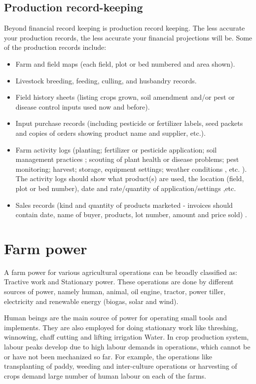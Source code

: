 \documentclass[11pt,]{book}
\providecommand{\tightlist}{%
  \setlength{\itemsep}{0pt}\setlength{\parskip}{0pt}}
\theoremstyle{definition}
\theoremstyle{definition}
\theoremstyle{definition}
\theoremstyle{remark}
\begin{document}

\subsection{Production record-keeping}\label{production-record-keeping}

Beyond financial record keeping is production record keeping. The less
accurate your production records, the less accurate your financial
projections will be. Some of the production records include:

\begin{itemize}
\tightlist
\item
  Farm and field maps (each field, plot or bed numbered and area shown).
\item
  Livestock breeding, feeding, culling, and husbandry records.
\item
  Field history sheets (listing crops grown, soil amendment and/or pest
  or disease control inputs used now and before).
\item
  Input purchase records (including pesticide or fertilizer labels, seed
  packets and copies of orders showing product name and supplier, etc.).
\item
  Farm activity logs (planting; fertilizer or pesticide application;
  soil management practices ; scouting of plant health or disease
  problems; pest monitoring; harvest; storage, equipment settings;
  weather conditions , etc. ). The activity logs should show what
  product(s) are used, the location (field, plot or bed number), date
  and rate/quantity of application/settings ,etc.
\item
  Sales records (kind and quantity of products marketed - invoices
  should contain date, name of buyer, products, lot number, amount and
  price sold) .
\end{itemize}

\section{Farm power}\label{farm-power}

A farm power for various agricultural operations can be broadly
classified as: Tractive work and Stationary power. These operations are
done by different sources of power, namely human, animal, oil engine,
tractor, power tiller, electricity and renewable energy (biogas, solar
and wind).

Human beings are the main source of power for operating small tools and
implements. They are also employed for doing stationary work like
threshing, winnowing, chaff cutting and lifting irrigation Water. In
crop production system, labour peaks develop due to high labour demands
in operations, which cannot be or have not been mechanized so far. For
example, the operations like transplanting of paddy, weeding and
inter-culture operations or harvesting of crops demand large number of
human labour on each of the farms.
\end{document}
